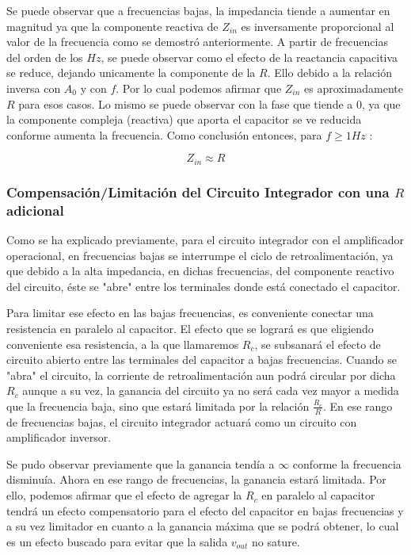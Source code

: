 Se puede observar que a frecuencias bajas, la impedancia tiende a aumentar en magnitud ya que la componente reactiva de 
$Z_{in}$ es inversamente proporcional al valor de la frecuencia como se demostró anteriormente.
A partir de frecuencias del orden de los $Hz$, se puede observar como el efecto de la reactancia capacitiva 
se reduce, dejando unicamente la componente de la $R$. Ello debido a la relación inversa con $A_0$ y con $f$.
Por lo cual podemos afirmar que $Z_{in}$ es aproximadamente $R$ para esos casos.
Lo mismo se puede observar con la fase que tiende a 0, ya que la componente compleja (reactiva) que aporta el capacitor se ve reducida conforme aumenta la frecuencia.
Como conclusión entonces, para $f \geq 1Hz$ :

$$Z_{in} \approx R$$

\subsubsection{Compensación/Limitación del Circuito Integrador con una $R$ adicional}

Como se ha explicado previamente, para el circuito integrador con el amplificador operacional, en frecuencias bajas se interrumpe el ciclo de retroalimentación,
ya que debido a la alta impedancia, en dichas frecuencias, del componente reactivo del circuito, éste se "abre" entre los terminales donde está conectado el capacitor.

Para limitar ese efecto en las bajas frecuencias, es conveniente conectar una resistencia en paralelo al capacitor. El efecto que se logrará es que eligiendo conveniente esa resistencia,
a la que llamaremos $R_c$, se subsanará el efecto de circuito abierto entre las terminales del capacitor a bajas frecuencias. Cuando se "abra" el circuito, la corriente de retroalimentación
aun podrá circular por dicha $R_c$ aunque a su vez, la ganancia del circuito ya no será cada vez mayor a medida que la frecuencia baja, sino que estará limitada por la relación 
$\frac{R_c}{R}$. En ese rango de frecuencias bajas, el circuito integrador actuará como un circuito con amplificador inversor. 

Se pudo observar previamente que la ganancia tendía a $\infty$ conforme la frecuencia disminuía. Ahora en ese rango de frecuencias, la ganancia estará limitada. Por ello, podemos
afirmar que el efecto de agregar la $R_c$ en paralelo al capacitor tendrá un efecto compensatorio para el efecto del capacitor en bajas frecuencias y a su vez limitador en cuanto a la 
ganancia máxima que se podrá obtener, lo cual es un efecto buscado para evitar que la salida $v_{out}$ no sature.

